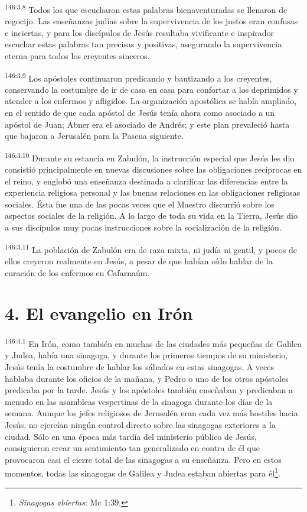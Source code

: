 \par
\textsuperscript{146:3.8} Todos los que escucharon estas palabras bienaventuradas se llenaron de regocijo. Las enseñanzas judías sobre la supervivencia de los justos eran confusas e inciertas, y para los discípulos de Jesús resultaba vivificante e inspirador escuchar estas palabras tan precisas y positivas, asegurando la supervivencia eterna para todos los creyentes sinceros.

\par
\textsuperscript{146:3.9} Los apóstoles continuaron predicando y bautizando a los creyentes, conservando la costumbre de ir de casa en casa para confortar a los deprimidos y atender a los enfermos y afligidos. La organización apostólica se había ampliado, en el sentido de que cada apóstol de Jesús tenía ahora como asociado a un apóstol de Juan; Abner era el asociado de Andrés; y este plan prevaleció hasta que bajaron a Jerusalén para la Pascua siguiente.

\par
\textsuperscript{146:3.10} Durante su estancia en Zabulón, la instrucción especial que Jesús les dio consistió principalmente en nuevas discusiones sobre las obligaciones recíprocas en el reino, y englobó una enseñanza destinada a clarificar las diferencias entre la experiencia religiosa personal y las buenas relaciones en las obligaciones religiosas sociales. Ésta fue una de las pocas veces que el Maestro discurrió sobre los aspectos sociales de la religión. A lo largo de toda su vida en la Tierra, Jesús dio a sus discípulos muy pocas instrucciones sobre la socialización de la religión.

\par
\textsuperscript{146:3.11} La población de Zabulón era de raza mixta, ni judía ni gentil, y pocos de ellos creyeron realmente en Jesús, a pesar de que habían oído hablar de la curación de los enfermos en Cafarnaúm.

\section*{4. El evangelio en Irón}
\par
\textsuperscript{146:4.1} En Irón, como también en muchas de las ciudades más pequeñas de Galilea y Judea, había una sinagoga, y durante los primeros tiempos de su ministerio, Jesús tenía la costumbre de hablar los sábados en estas sinagogas. A veces hablaba durante los oficios de la mañana, y Pedro o uno de los otros apóstoles predicaba por la tarde. Jesús y los apóstoles también enseñaban y predicaban a menudo en las asambleas vespertinas de la sinagoga durante los días de la semana. Aunque los jefes religiosos de Jerusalén eran cada vez más hostiles hacia Jesús, no ejercían ningún control directo sobre las sinagogas exteriores a la ciudad. Sólo en una época más tardía del ministerio público de Jesús, consiguieron crear un sentimiento tan generalizado en contra de él que provocaron casi el cierre total de las sinagogas a su enseñanza. Pero en estos momentos, todas las sinagogas de Galilea y Judea estaban abiertas para él\footnote{\textit{Sinagogas abiertas}: Mc 1:39.}.

